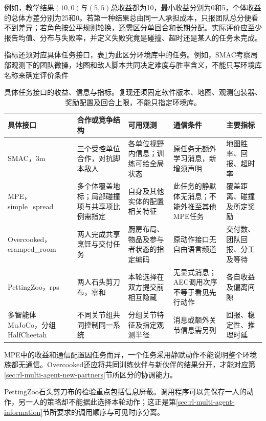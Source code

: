 例如，教学结果$(10,0)$与$(5,5)$总收益都为10，最小收益分别为0和5，个体收益的总体方差分别为25和0。若第一种结果总由同一人承担成本，只报团队总分便看不到差异；若角色按公平规则轮换，还需区分单回合和长期分配。实际评价应至少报告均值、分布与失败率，并定义失败究竟是碰撞、超时还是某人的任务未完成。

指标还须对应具体任务接口，表\ref{tab:rl-multi-agent-benchmarks}为此区分环境库中的任务。例如，SMAC考察局部观测下的团队微操，地图和敌人脚本共同决定难度与胜率含义，不能只写环境库名称来确定评价条件

\begin{table}[t]
 \centering
 \begin{tabularx}{\linewidth}{@{}l >{\raggedright\arraybackslash}X >{\raggedright\arraybackslash}X >{\raggedright\arraybackslash}X >{\raggedright\arraybackslash}X@{}}
 \toprule
 具体接口 & 合作或竞争结构 & 可用观测 & 通信条件 & 主要指标\\
 \midrule
 SMAC，3m & 三个受控单位合作，对抗脚本敌人 & 各单位视野内信息；训练可给全局状态 & 原任务无额外学习消息，新增须声明 & 地图胜率、回报、超时率\\
 MPE，simple\_spread & 多个体覆盖地标；局部碰撞项与共享项比例需指定 & 自身及其他实体的配置相关特征 & 此任务的静默体无消息；不能外推至其他MPE任务 & 覆盖距离、碰撞及所定奖励\\
 Overcooked，cramped\_room & 两人完成共享烹饪与交付任务 & 厨房布局、物品及参与者状态的指定编码 & 原动作接口无自由语言频道 & 交付数、团队回报、分工及等待\\
 PettingZoo，rps & 两人石头剪刀布，零和 & 本轮选择在双方提交前相互隐藏 & 无显式消息；AEC调用次序不等于看见先行动作 & 各自收益及偏离间隙\\
 多智能体MuJoCo，分组HalfCheetah & 不同关节组共同控制同一系统 & 分组关节特征及指定观测半径 & 消息或额外关节信息需另列 & 回报、稳定性、推理时延\\
 \bottomrule
 \end{tabularx}
 \caption{具体任务接口的收益、信息与指标。复现还须固定软件版本、地图、观测包装器、奖励配置及回合上限，不能只指定环境库。}
 \label{tab:rl-multi-agent-benchmarks}
\end{table}

MPE中的收益和通信配置因任务而异，一个任务采用静默动作不能说明整个环境族都无通信。Overcooked还应将共同训练伙伴与新伙伴的结果分开，才能对应第\ref{sec:rl-multi-agent-new-partners}节所区分的协调能力。

PettingZoo石头剪刀布的检验重点包括信息屏蔽。调用程序可以先保存一人的动作，另一人的策略却不能据此选择本轮动作；这正是第\ref{sec:rl-multi-agent-information}节所要求的调用顺序与可见时序分离。

